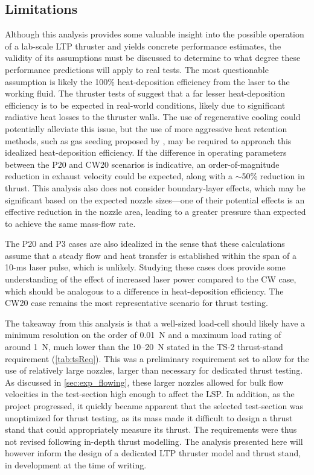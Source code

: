         \subsection{Limitations}
            Although this analysis provides some valuable insight into the possible operation of a lab-scale LTP thruster and yields concrete performance estimates, the validity of its assumptions must be discussed to determine to what degree these performance predictions will apply to real tests. The most questionable assumption is likely the 100\% heat-deposition efficiency from the laser to the working fluid. The thruster tests of \textcite{toyodaThrustPerformanceCW2002} suggest that a far lesser heat-deposition efficiency is to be expected in real-world conditions, likely due to significant radiative heat losses to the thruster walls. The use of regenerative cooling could potentially alleviate this issue, but the use of more aggressive heat retention methods, such as gas seeding proposed by \textcite{shojiPerformanceHeatTransfer1976}, may be required to approach this idealized heat-deposition efficiency. If the difference in operating parameters between the P20 and CW20 scenarios is indicative, an order-of-magnitude reduction in exhaust velocity could be expected, along with a $\sim$50\% reduction in thrust. This analysis also does not consider boundary-layer effects, which may be significant based on the expected nozzle sizes---one of their potential effects is an effective reduction in the nozzle area, leading to a greater pressure than expected to achieve the same mass-flow rate.

            The P20 and P3 cases are also idealized in the sense that these calculations assume that a steady flow and heat transfer is established within the span of a 10-ms laser pulse, which is unlikely. Studying these cases does provide some understanding of the effect of increased laser power compared to the CW case, which should be analogous to a difference in heat-deposition efficiency. The CW20 case remains the most representative scenario for thrust testing.

            The takeaway from this analysis is that a well-sized load-cell should likely have a minimum resolution on the order of \qty{0.01}{N} and a maximum load rating of around \qty{1}{N}, much lower than the 10--\qty{20}{N} stated in the TS-2 thrust-stand requirement (\autoref{tab:tsReq}). This was a preliminary requirement set to allow for the use of relatively large nozzles, larger than necessary for dedicated thrust testing. As discussed in \autoref{sec:exp_flowing}, these larger nozzles allowed for bulk flow velocities in the test-section high enough to affect the LSP. In addition, as the project progressed, it quickly became apparent that the selected test-section was unoptimized for thrust testing, as its mass made it difficult to design a thrust stand that could appropriately measure its thrust. The requirements were thus not revised following in-depth thrust modelling. The analysis presented here will however inform the design of a dedicated LTP thruster model and thrust stand, in development at the time of writing.